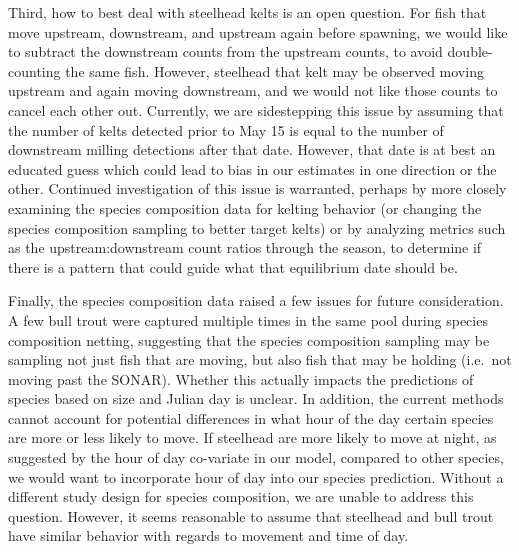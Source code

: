 \documentclass[
]{article}
\begin{document}
Third, how to best deal with steelhead kelts is an open question. For fish that move upstream, downstream, and upstream again before spawning, we would like to subtract the downstream counts from the upstream counts, to avoid double-counting the same fish. However, steelhead that kelt may be observed moving upstream and again moving downstream, and we would not like those counts to cancel each other out. Currently, we are sidestepping this issue by assuming that the number of kelts detected prior to May 15 is equal to the number of downstream milling detections after that date. However, that date is at best an educated guess which could lead to bias in our estimates in one direction or the other. Continued investigation of this issue is warranted, perhaps by more closely examining the species composition data for kelting behavior (or changing the species composition sampling to better target kelts) or by analyzing metrics such as the upstream:downstream count ratios through the season, to determine if there is a pattern that could guide what that equilibrium date should be.

Finally, the species composition data raised a few issues for future consideration. A few bull trout were captured multiple times in the same pool during species composition netting, suggesting that the species composition sampling may be sampling not just fish that are moving, but also fish that may be holding (i.e.~not moving past the SONAR). Whether this actually impacts the predictions of species based on size and Julian day is unclear. In addition, the current methods cannot account for potential differences in what hour of the day certain species are more or less likely to move. If steelhead are more likely to move at night, as suggested by the hour of day co-variate in our model, compared to other species, we would want to incorporate hour of day into our species prediction. Without a different study design for species composition, we are unable to address this question. However, it seems reasonable to assume that steelhead and bull trout have similar behavior with regards to movement and time of day.
\end{document}
